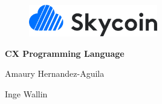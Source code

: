 \documentclass[11pt,fleqn,openany]{book} %
\begin{document}
\raggedbottom


\begingroup
\thispagestyle{empty}
\centering

\vspace*{2.5cm}

\begin{figure}[h]
    \centering
    \includegraphics[width=0.5\textwidth]{img/skycoin-logo.png}
\end{figure}

\vspace*{2.5cm}
\par\normalfont\fontsize{35}{35}\sffamily\selectfont
\textbf{CX Programming Language}\\
\par\normalfont\fontsize{20}{20}\sffamily\selectfont
\vspace*{0.5cm}

\vspace*{1cm}
{\Huge Amaury Hernandez-Aguila}\par %
{\Huge Inge Wallin}\par %

\endgroup


\newpage
~\vfill
\thispagestyle{empty}



\end{document}
